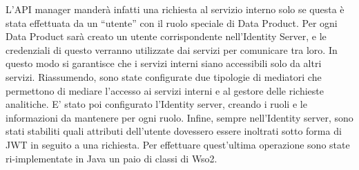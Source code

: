 \documentclass[a4paper,12pt]{report}
\begin{document}
L'API manager manderà infatti una richiesta al servizio interno solo se questa è stata effettuata da un ``utente'' con il ruolo speciale di Data Product.
Per ogni Data Product sarà creato un utente corrispondente nell'Identity Server, e le credenziali di questo verranno utilizzate dai servizi per comunicare tra loro.
In questo modo si garantisce che i servizi interni siano accessibili solo da altri servizi.
Riassumendo, sono state configurate due tipologie di mediatori che permettono di mediare l'accesso ai servizi interni e al gestore delle richieste analitiche.
E' stato poi configurato l'Identity server, creando i ruoli e le informazioni da mantenere per ogni ruolo.
Infine, sempre nell'Identity server, sono stati stabiliti quali attributi dell'utente dovessero essere inoltrati sotto forma di JWT in seguito a una richiesta.
Per effettuare quest'ultima operazione sono state ri-implementate in Java un paio di classi di Wso2.
\end{document}

